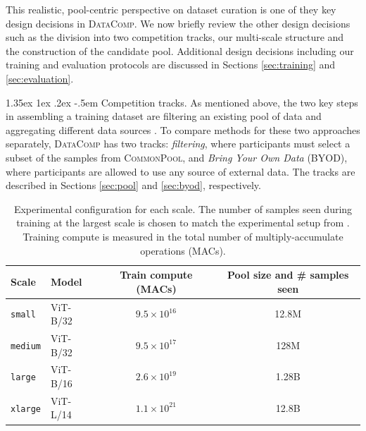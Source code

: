 \documentclass[dvipsnames,11pt]{article}
\makeatletter
\renewcommand\paragraph{\@startsection{paragraph}{4}{\z@}                                     {1.35ex \@plus1ex \@minus.2ex}                                {-.5em}
{\normalfont\normalsize\bfseries}}
\newcommand{\datanet}{\textsc{DataComp}\xspace}
\newcommand{\users}{participants\xspace}
\newcommand{\byod}{\textsc{BYOD}\xspace}
\newcommand{\pool}{\textsc{CommonPool}\xspace}
\makeatother
\begin{document}
This realistic, pool-centric perspective on dataset curation is one of they key design decisions in \datanet.
We now briefly review the other design decisions such as the division into two competition tracks, our multi-scale structure and the construction of the candidate pool.
Additional design decisions including our training and evaluation protocols are discussed in Sections \ref{sec:training} and \ref{sec:evaluation}.

\paragraph{Competition tracks.} As mentioned above, the two key steps in assembling a training dataset are filtering an existing pool of data \cite{laion400m, laion5b, coyo700m} and aggregating different data sources \cite{dave2020tao, deng2009imagenet}.
To compare methods for these two approaches separately, \datanet has two tracks: \textit{filtering}, where \users must select a subset of the samples from \pool, and \textit{Bring Your Own Data} (\byod), where \users are allowed to use any source of external data. The tracks are described in Sections \ref{sec:pool} and \ref{sec:byod}, respectively. 

\begin{table}
\caption{Experimental configuration for each scale. The number of samples seen during training at the largest scale is chosen to match the experimental setup from \citet{radford2021learning}. Training compute is measured in the total number of multiply-accumulate operations (MACs).}
\setlength\tabcolsep{8.5pt}
\renewcommand{\arraystretch}{1.1}
\small
\centering
\begin{tabular}{llcc}
\toprule
Scale  & Model    & Train compute (MACs) & Pool size and \# samples seen\\\midrule
{\small \texttt{small}}    & ViT-B/32 & $9.5\times 10^{16}$ & 12.8M\\
{\small \texttt{medium}}   & ViT-B/32 & $9.5\times 10^{17}$ & 128M  \\
{\small \texttt{large}}	& ViT-B/16 & $2.6\times 10^{19}$ & 1.28B   \\
{\small \texttt{xlarge}}	& ViT-L/14 & $1.1\times 10^{21}$ & 12.8B \\
\bottomrule
\end{tabular}
\label{tab:scale-hparams}
\end{table}
\end{document}
